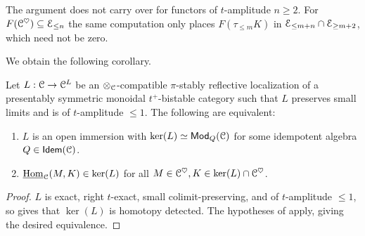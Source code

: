 \begin{remark}\label{rmk: sharpness of t-amplitude bound}
    The argument does not carry over for functors of $t$-amplitude $n\geq 2$. For $F(\EuScript{C}^{\heartsuit})\subseteq\EuScript{E}_{\leq n}$ the same computation only places $F(\tau_{\leq m}K)$ in $\EuScript{E}_{\leq m+n}\cap\EuScript{E}_{\geq m+2}$, which need not be zero. 
\end{remark}
We obtain the following corollary. 
\begin{corollary}\label{cor: recognition at t-amplitude 1}
    Let $L:\EuScript{C}\to\EuScript{C}^{L}$ be an $\otimes_{\EuScript{C}}$-compatible $\pi$-stably reflective localization of a presentably symmetric monoidal $t^{+}$-bistable category such that $L$ preserves small limits and is of $t$-amplitude $\leq 1$. The following are equivalent: 
    \begin{enumerate}[label=(\alph*)]
        \item $L$ is an open immersion with $\ker(L)\simeq\mathsf{Mod}_{Q}(\EuScript{C})$ for some idempotent algebra $Q\in\mathsf{Idem}(\EuScript{C})$. 
        \item $\underline{\mathrm{Hom}}_{\EuScript{C}}(M, K)\in\ker(L)$ for all $M\in \EuScript{C}^{\heartsuit},K\in\ker(L)\cap\EuScript{C}^{\heartsuit}$. 
    \end{enumerate}
\end{corollary}
\begin{proof}
    $L$ is exact, right $t$-exact, small colimit-preserving, and of $t$-amplitude $\leq 1$, so  gives that $\ker(L)$ is homotopy detected. The hypotheses of  apply, giving the desired equivalence. 
\end{proof}